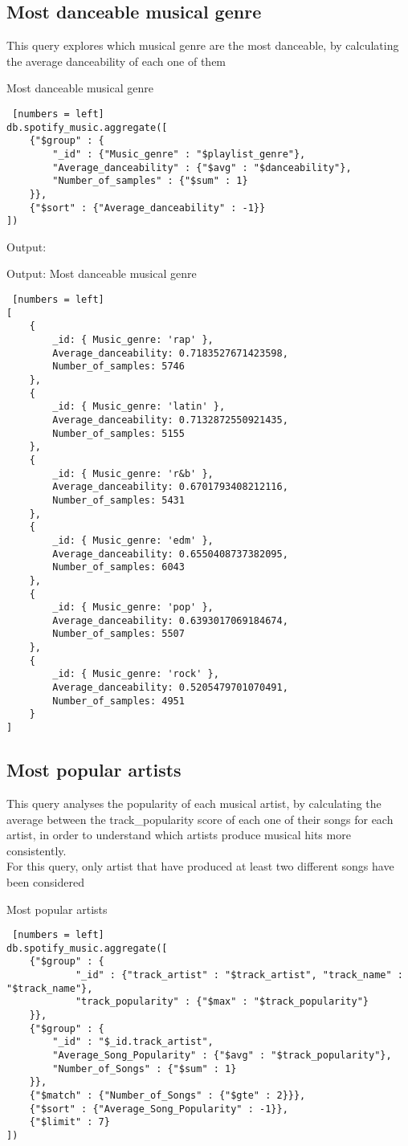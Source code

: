 \documentclass{Configuration_Files/PoliMi3i_thesis}
\begin{document}
\subsection{Most danceable musical genre}
This query explores which musical genre are the most danceable, by calculating the average danceability of each one of them\\
\begin{algorithm}[ht]
\caption{Most danceable musical genre}
\begin{lstlisting} [numbers = left]
db.spotify_music.aggregate([
	{"$group" : {
		"_id" : {"Music_genre" : "$playlist_genre"},
		"Average_danceability" : {"$avg" : "$danceability"},
		"Number_of_samples" : {"$sum" : 1}
	}},
  	{"$sort" : {"Average_danceability" : -1}}
])
\end{lstlisting}
\end{algorithm}
\newpage

Output:
\begin{algorithm}[ht]
\caption{Output: Most danceable musical genre}
\begin{lstlisting} [numbers = left]
[
	{
		_id: { Music_genre: 'rap' },
		Average_danceability: 0.7183527671423598,
		Number_of_samples: 5746
	},
	{
		_id: { Music_genre: 'latin' },
		Average_danceability: 0.7132872550921435,
		Number_of_samples: 5155
	},
	{
		_id: { Music_genre: 'r&b' },
		Average_danceability: 0.6701793408212116,
		Number_of_samples: 5431
	},
	{
		_id: { Music_genre: 'edm' },
		Average_danceability: 0.6550408737382095,
		Number_of_samples: 6043
	},
	{
		_id: { Music_genre: 'pop' },
		Average_danceability: 0.6393017069184674,
		Number_of_samples: 5507
	},
	{
		_id: { Music_genre: 'rock' },
		Average_danceability: 0.5205479701070491,
		Number_of_samples: 4951
	}
]
\end{lstlisting}
\end{algorithm}
\newpage
\subsection{Most popular artists}
This query analyses the popularity of each musical artist, by calculating the average between the track\_popularity score of each one of their songs for each artist, in order to understand which artists produce musical hits more consistently.\\
For this query, only artist that have produced at least two different songs have been considered
\begin{algorithm}[ht]
\caption{Most popular artists}
\begin{lstlisting} [numbers = left]
db.spotify_music.aggregate([
	{"$group" : {
			"_id" : {"track_artist" : "$track_artist", "track_name" : "$track_name"},
			"track_popularity" : {"$max" : "$track_popularity"}
	}},
	{"$group" : {
		"_id" : "$_id.track_artist",
		"Average_Song_Popularity" : {"$avg" : "$track_popularity"},
		"Number_of_Songs" : {"$sum" : 1}
	}},
	{"$match" : {"Number_of_Songs" : {"$gte" : 2}}},
	{"$sort" : {"Average_Song_Popularity" : -1}},
	{"$limit" : 7}
])
\end{lstlisting}
\end{algorithm}
\newpage
\end{document}
